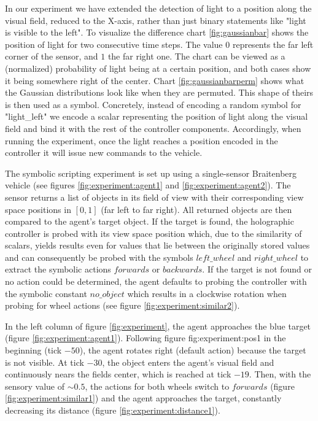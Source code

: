 \documentclass[a4paper,twoside]{article}
\begin{document}
	In our experiment we have extended the detection of light to a position along the visual field, reduced to the X-axis, rather than just binary statements like "light is visible to the left". To visualize the difference chart \ref{fig:gaussianbar} shows the position of light for two consecutive time steps. The value $0$ represents the far left corner of the sensor, and $1$ the far right one. The chart can be viewed as a (normalized) probability of light being at a certain position, and both cases show it being somewhere right of the center. Chart \ref{fig:gaussianbarperm} shows what the Gaussian distributions look like when they are permuted. This shape of theirs is then used as a symbol. Concretely, instead of encoding a random symbol for "light\_left" we encode a scalar representing the position of light along the visual field and bind it with the rest of the controller components. Accordingly, when running the experiment, once the light reaches a position encoded in the controller it will issue new commands to the vehicle.

The symbolic scripting experiment is set up using a single-sensor Braitenberg
vehicle (see figures \ref{fig:experiment:agent1} and
\ref{fig:experiment:agent2}).
The sensor returns a list of objects in its field of view with their
corresponding view space positions in $[0,1]$ (far left to far right).
All returned objects are then compared to the agent's target object.
If the target is found, the holographic controller is probed with its view space
position which, due to the similarity of scalars, yields results even for
values that lie between the originally stored values and can consequently be
probed with the symbols $left\_wheel$ and $right\_wheel$ to extract the symbolic
actions $forwards$ or $backwards$.
If the target is not found or no action could be determined, the agent defaults
to probing the controller with the symbolic constant $no\_object$ which results in
a clockwise rotation when probing for wheel actions (see figure
\ref{fig:experiment:similar2}).

In the left column of figure \ref{fig:experiment}, the agent approaches the blue
target (figure \ref{fig:experiment:agent1}). Following figure {fig:experiment:pos1} in the beginning (tick $-50$), the
agent rotates right (default action) because the target is not visible.
At tick $-30$, the object enters the agent's visual field and continuously nears the fields center, which is reached at tick $-19$.
Then, with the sensory value of ${\sim}0.5$, the actions for both wheels switch
to $forwards$ (figure \ref{fig:experiment:similar1}) and the agent approaches
the target, constantly decreasing its distance
(figure \ref{fig:experiment:distance1}).
\end{document}
